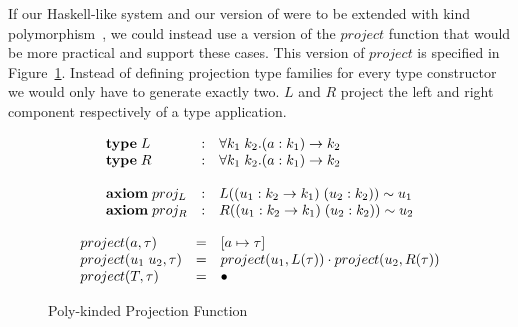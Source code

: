 If our Haskell-like system and our version of \systemfc were to be extended
with kind polymorphism~\cite{yorgey}, we could instead use a version of the
$project$ function that would be more practical and support these cases. This
version of $project$ is specified in Figure~\ref{fig:poly-project}. Instead of
defining projection type families for every type constructor we would only have
to generate exactly two. $L$ and $R$ project the left and right component
respectively of a type application.

\[
\begin{array}{l c l}
    \textbf{type} \; L &: &\forall k_1 \; k_2. (a : k_1) \rightarrow k_2
    \\
    \textbf{type} \; R &: &\forall k_1 \; k_2. (a : k_1) \rightarrow k_2
    \\
    \\
    \textbf{axiom} \; proj_L &:& L((u_1 : k_2 \rightarrow k_1) \; (u_2 : k_2))
    \sim u_1
    \\
    \textbf{axiom} \; proj_R &:& R((u_1 : k_2 \rightarrow k_1) \; (u_2 : k_2))
    \sim u_2
\end{array}
\]
\begin{figure}
\[
\begin{array}{l c l}

    project(a, \tau) & = & [a \mapsto \tau]
    \\
    project(u_1 \; u_2, \tau) & = &
    project(u_1, L(\tau)) \cdot project(u_2, R(\tau))
    \\
    project(T, \tau) & = & \bullet
\end{array}
\]
\caption{Poly-kinded Projection Function}
\label{fig:poly-project}
\end{figure}
